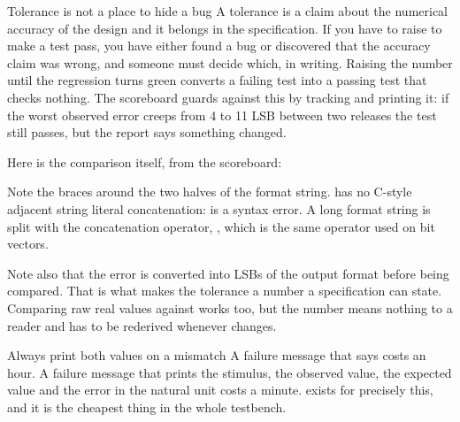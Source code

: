 \begin{gotcha}{Tolerance is not a place to hide a bug}
A tolerance is a claim about the numerical accuracy of the design and it
belongs in the specification. If you have to raise  to make a
test pass, you have either found a bug or discovered that the accuracy claim
was wrong, and someone must decide which, in writing. Raising the number until
the regression turns green converts a failing test into a passing test that
checks nothing. The scoreboard guards against this by tracking
 and printing it: if the worst observed error creeps from 4 to
11 LSB between two releases the test still passes, but the report says
something changed.
\end{gotcha}

Here is the comparison itself, from the scoreboard:


Note the braces around the two halves of the format string. \SV{} has no
C-style adjacent string literal concatenation:  is a syntax
error. A long format string is split with the concatenation operator,
, which is the same operator used on bit vectors.

Note also that the error is converted into LSBs of the output format before being
compared. That is what makes the tolerance a number a specification can state.
Comparing raw real values against  works too, but the number means
nothing to a reader and has to be rederived whenever  changes.

\begin{tipbox}{Always print both values on a mismatch}
A failure message that says  costs an hour. A failure
message that prints the stimulus, the observed value, the expected value and
the error in the natural unit costs a minute.  exists
for precisely this, and it is the cheapest thing in the whole testbench.
\end{tipbox}

